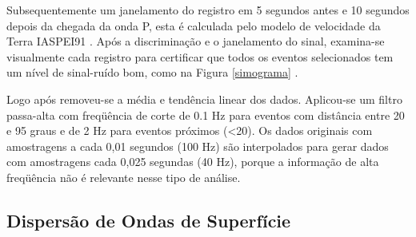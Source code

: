 Subsequentemente um janelamento do registro em 5 segundos antes e 10 segundos depois da chegada da onda P, esta é calculada pelo modelo de velocidade da Terra  IASPEI91 \citep{kennet_iaspei_1991}. Após a discriminação e o janelamento do sinal, examina-se visualmente cada registro para certificar que todos os eventos selecionados tem um nível de sinal-ruído bom, como na Figura \ref{simograma} . 

Logo após removeu-se a média e tendência linear dos dados. Aplicou-se um filtro passa-alta com freqüência de corte de 0.1 Hz para eventos com distância entre 20 e 95 graus e de 2 Hz para eventos próximos (<20). Os dados originais com amostragens a cada 0,01 segundos (100 Hz) são interpolados para gerar dados com amostragens cada 0,025 segundas (40 Hz), porque a informação de alta freqüência não é relevante nesse tipo de análise.

\subsection{Dispersão de Ondas de Superfície}